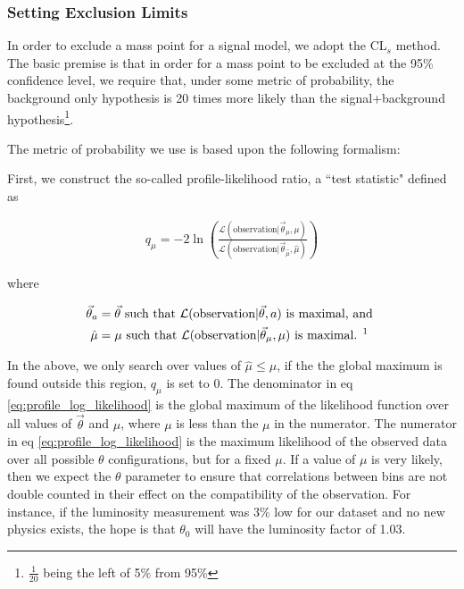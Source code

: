     \subsubsection{Setting Exclusion Limits}

      In order to exclude a mass point for a signal model, we adopt the CL$_s$ method. The basic premise is that in order for a mass point to be excluded at the 95\% confidence level, we require that, under some metric of probability, the background only hypothesis is 20 times more likely than the signal+background hypothesis\footnote{$\frac{1}{20}$ being the left of 5\% from 95\%}.

      The metric of probability we use is based upon the following formalism: 

      First, we construct the so-called profile-likelihood ratio, a ``test statistic" defined as

      \begin{align} \label{eq:profile_log_likelihood}
        q_\mu = -2 \ln \left( \frac{\mathcal{L}(\text{observation} | \vec{\theta}_{\mu}, \mu)}{\mathcal{L}(\text{observation} | \vec{\theta}_{\hat{\mu}}, \hat{\mu})} \right)
      \end{align}

      where

      \begin{align*}
        \vec{\theta}_a &= \vec{\theta} \text{ such that } \mathcal{L}(\text{observation} | \vec{\theta}, a) \text{ is maximal, and } \\
        \hat{\mu} &= \mu \text{ such that } \mathcal{L}(\text{observation} | \vec{\theta}_\mu, \mu) \text{ is maximal. \footnotemark{} }
      \end{align*}
      
       In the above, we only search over values of $\hat{\mu} \le \mu$, if the the global maximum is found outside this region, $q_\mu$ is set to 0. The denominator in eq \ref{eq:profile_log_likelihood} is the global maximum of the likelihood function over all values of $\vec{\theta}$ and $\mu$, where $\mu$ is less than the $\mu$ in the numerator. The numerator in eq \ref{eq:profile_log_likelihood} is the maximum likelihood of the observed data over all possible $\theta$ configurations, but for a fixed $\mu$. If a value of $\mu$ is very likely, then we expect the $\theta$ parameter to ensure that correlations between bins are not double counted in their effect on the compatibility of the observation. For instance, if the luminosity measurement was 3\% low for our dataset and no new physics exists, the hope is that $\theta_0$ will have the luminosity factor of 1.03.


